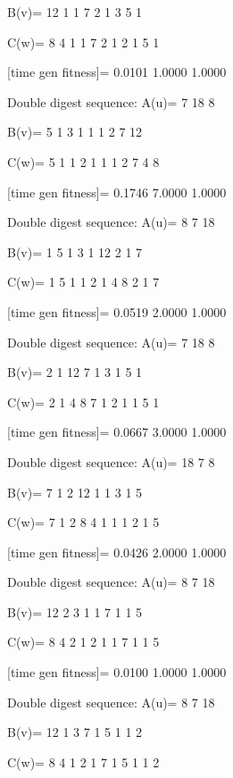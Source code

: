 B(v)=
    12     1     1     7     2     1     3     5     1

C(w)=
     8     4     1     1     7     2     1     2     1     5     1

[time gen fitness]=
    0.0101    1.0000    1.0000

Double digest sequence:
A(u)=
     7    18     8

B(v)=
     5     1     3     1     1     1     2     7    12

C(w)=
     5     1     1     2     1     1     1     2     7     4     8

[time gen fitness]=
    0.1746    7.0000    1.0000

Double digest sequence:
A(u)=
     8     7    18

B(v)=
     1     5     1     3     1    12     2     1     7

C(w)=
     1     5     1     1     2     1     4     8     2     1     7

[time gen fitness]=
    0.0519    2.0000    1.0000

Double digest sequence:
A(u)=
     7    18     8

B(v)=
     2     1    12     7     1     3     1     5     1

C(w)=
     2     1     4     8     7     1     2     1     1     5     1

[time gen fitness]=
    0.0667    3.0000    1.0000

Double digest sequence:
A(u)=
    18     7     8

B(v)=
     7     1     2    12     1     1     3     1     5

C(w)=
     7     1     2     8     4     1     1     1     2     1     5

[time gen fitness]=
    0.0426    2.0000    1.0000

Double digest sequence:
A(u)=
     8     7    18

B(v)=
    12     2     3     1     1     7     1     1     5

C(w)=
     8     4     2     1     2     1     1     7     1     1     5

[time gen fitness]=
    0.0100    1.0000    1.0000

Double digest sequence:
A(u)=
     8     7    18

B(v)=
    12     1     3     7     1     5     1     1     2

C(w)=
     8     4     1     2     1     7     1     5     1     1     2

